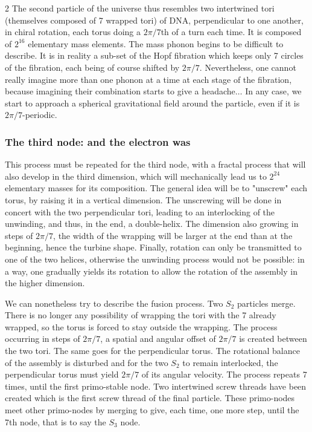\begin{multicols}{2}
	The second particle of the universe thus resembles two intertwined tori 
	(themselves composed of 7 wrapped tori) of DNA, perpendicular to one 
	another, in chiral rotation, each torus doing a $2\pi/7$th of a turn 
	each time. It is composed of $2^{16}$ elementary mass elements. The 
	mass phonon begins to be difficult to describe. It is in reality a 
	sub-set of the Hopf fibration which keeps only 7 circles of the 
	fibration, each being of course shifted by $2\pi/7$. Nevertheless, one 
	cannot really imagine more than one phonon at a time at each stage of 
	the fibration, because imagining their combination starts to give a 
	headache$\dots$ In any case, we start to approach a spherical 
	gravitational field around the particle, even if it is $2\pi/7$-periodic.
	
	\subsubsection{The third node: and the electron was}
	
	This process must be repeated for the third node, with a fractal process 
	that will also develop in the third dimension, which will mechanically 
	lead us to $2^{24}$ elementary masses for its composition. The general 
	idea will be to "unscrew" each torus, by raising it in a vertical 
	dimension. The unscrewing will be done in concert with the two 
	perpendicular tori, leading to an interlocking of the unwinding, and 
	thus, in the end, a double-helix. The dimension also growing in steps of 
	$2\pi/7$, the width of the wrapping will be larger at the end than at the 
	beginning, hence the turbine shape. Finally, rotation can only be 
	transmitted to one of the two helices, otherwise the unwinding process 
	would not be possible: in a way, one gradually yields its rotation to 
	allow the rotation of the assembly in the higher dimension.
	
	We can nonetheless try to describe the fusion process. Two $S_2$ particles 
	merge. There is no longer any possibility of wrapping the tori with the 7 
	already wrapped, so the torus is forced to stay outside the wrapping. 
	The process occurring in steps of $2\pi/7$, a spatial and angular offset 
	of $2\pi/7$ is created between the two tori. The same goes for the 
	perpendicular torus. The rotational balance of the assembly is disturbed 
	and for the two $S_2$ to remain interlocked, the perpendicular torus must 
	yield $2\pi/7$ of its angular velocity. The process repeats 7 times, 
	until the first primo-stable node. Two intertwined screw threads have 
	been created which is the first screw thread of the final particle. 
	These primo-nodes meet other primo-nodes by merging to give, each time, 
	one more step, until the 7th node, that is to say the $S_3$ node.
	

\end{multicols}
